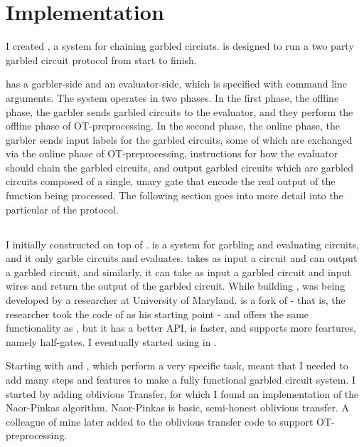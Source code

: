 \chapter{Implementation}

I created \CompGC, a system for chaining garbled circiuts.
\CompGC is designed to run a two party garbled circuit protocol from start to finish.

\CompGC has a garbler-side and an evaluator-side, which is specified with command line arguments.
The \CompGC system operates in two phases.
In the first phase, the offline phase, the garbler sends garbled circuits to the evaluator, and they perform the offline phase of OT-preprocessing.
In the second phase, the online phase, the garbler sends input labels for the garbled circuits, some of which are exchanged via the online phase of OT-preprocessing, instructions for how the evaluator should chain the garbled circuits, and output garbled circuits which are garbled circuits composed of a single, unary gate that encode the real output of the function being processed.
The following section goes into more detail into the particular of the \CompGC protocol.

\section{\CompGC}
I initially constructed \CompGC on top of \JustGarble.
\JustGarble is a system for garbling and evaluating circuits, and it only garble circuits and evaluates.
\JustGarble takes as input a circuit and can output a garbled circuit, and similarly, it can take as input a garbled circuit and input wires and return the output of the garbled circuit.
While building \CompGC, \LibGarble was being developed by a researcher at University of Maryland.
\LibGarble is a fork of \JustGarble - that is, the researcher took the code of \JustGarble as his starting point -  and offers the same functionality as \JustGarble, but it has a better API, is faster, and supports more feartures, namely half-gates.
I eventually started using \LibGarble in \CompGC.

Starting with \JustGarble and \LibGarble, which perform a very specific task, meant that I needed to add many steps and features to make a fully functional garbled circuit system.
I started by adding oblivious Transfer, for which I found an implementation of the Naor-Pinkas algorithm.
Naor-Pinkas is basic, semi-honest oblivious transfer.
A colleague of mine later added to the oblivious transfer code to support OT-preprocessing.


